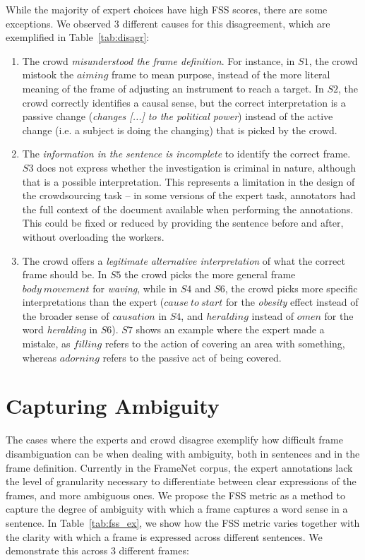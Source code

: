 While the majority of expert choices have high FSS scores, there are some exceptions. We observed 3 different causes for this disagreement, which are exemplified in Table~\ref{tab:disagr}:

\begin{enumerate}

\item The crowd \textit{misunderstood the frame definition}. For instance, in $S1$, the crowd mistook the $aiming$ frame to mean purpose, instead of the more literal meaning of the frame of adjusting an instrument to reach a target. In $S2$, the crowd correctly identifies a causal sense, but the correct interpretation is a passive change (\textit{changes [...] to the political power}) instead of the active change (i.e. a subject is doing the changing) that is picked by the crowd.

\item The \textit{information in the sentence is incomplete} to identify the correct frame. $S3$ does not express whether the investigation is criminal in nature, although that is a possible interpretation. This represents a limitation in the design of the crowdsourcing task -- in some versions of the expert task, annotators had the full context of the document available when performing the annotations. This could be fixed or reduced by providing the sentence before and after, without overloading the workers.

\item The crowd offers a \textit{legitimate alternative interpretation} of what the correct frame should be. In $S5$ the crowd picks the more general frame $body\ movement$ for \textit{waving}, while in $S4$ and $S6$, the crowd picks more specific interpretations than the expert ($cause\ to\ start$ for the \textit{obesity} effect instead of the broader sense of $causation$ in $S4$, and $heralding$ instead of $omen$ for the word \textit{heralding} in $S6$). $S7$ shows an example where the expert made a mistake, as $filling$ refers to the action of covering an area with something, whereas $adorning$ refers to the passive act of being covered.

\end{enumerate}

\section{Capturing Ambiguity}

The cases where the experts and crowd disagree exemplify how difficult frame disambiguation can be when dealing with ambiguity, both in sentences and in the frame definition. Currently in the FrameNet corpus, the expert annotations lack the level of granularity necessary to differentiate between clear expressions of the frames, and more ambiguous ones. We propose the FSS metric as a method to capture the degree of ambiguity with which a frame captures a word sense in a sentence. In Table~\ref{tab:fss_ex}, we show how the FSS metric varies together with the clarity with which a frame is expressed across different sentences. We demonstrate this across 3 different frames:

